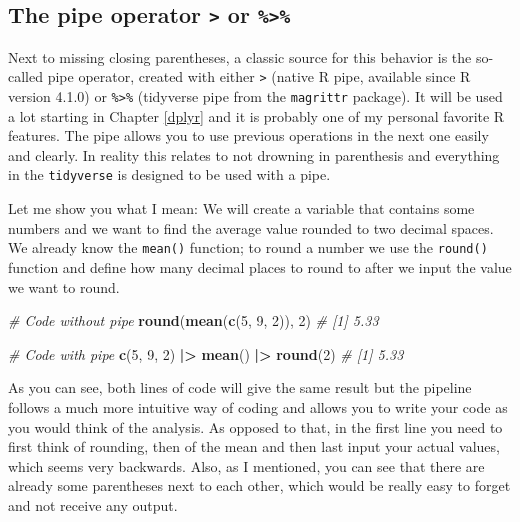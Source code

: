 \documentclass[
]{book}
\newenvironment{Shaded}{\begin{snugshade}}{\end{snugshade}}
\newcommand{\CommentTok}[1]{\textcolor[rgb]{0.56,0.35,0.01}{\textit{#1}}}
\newcommand{\DecValTok}[1]{\textcolor[rgb]{0.00,0.00,0.81}{#1}}
\newcommand{\FunctionTok}[1]{\textcolor[rgb]{0.13,0.29,0.53}{\textbf{#1}}}
\newcommand{\NormalTok}[1]{#1}
\newcommand{\SpecialCharTok}[1]{\textcolor[rgb]{0.81,0.36,0.00}{\textbf{#1}}}
\begin{document}
\subsection*{\texorpdfstring{The pipe operator \texttt{\textbar{}\textgreater{}} or \texttt{\%\textgreater{}\%}}{The pipe operator \textbar\textgreater{} or \%\textgreater\%}}\label{pipe}

Next to missing closing parentheses, a classic source for this behavior is the so-called pipe operator, created with either \texttt{\textbar{}\textgreater{}} (native R pipe, available since R version 4.1.0) or \texttt{\%\textgreater{}\%} (tidyverse pipe from the \texttt{magrittr} package).
It will be used a lot starting in Chapter \ref{dplyr} and it is probably one of my personal favorite R features.
The pipe allows you to use previous operations in the next one easily and clearly.
In reality this relates to not drowning in parenthesis and everything in the \texttt{tidyverse} is designed to be used with a pipe.

Let me show you what I mean: We will create a variable that contains some numbers and we want to find the average value rounded to two decimal spaces.
We already know the \texttt{mean()} function; to round a number we use the \texttt{round()} function and define how many decimal places to round to after we input the value we want to round.

\begin{Shaded}
\begin{Highlighting}[]
\CommentTok{\# Code without pipe}
\FunctionTok{round}\NormalTok{(}\FunctionTok{mean}\NormalTok{(}\FunctionTok{c}\NormalTok{(}\DecValTok{5}\NormalTok{, }\DecValTok{9}\NormalTok{, }\DecValTok{2}\NormalTok{)), }\DecValTok{2}\NormalTok{)}
\CommentTok{\# [1] 5.33}

\CommentTok{\# Code with pipe}
\FunctionTok{c}\NormalTok{(}\DecValTok{5}\NormalTok{, }\DecValTok{9}\NormalTok{, }\DecValTok{2}\NormalTok{) }\SpecialCharTok{|\textgreater{}} \FunctionTok{mean}\NormalTok{() }\SpecialCharTok{|\textgreater{}} \FunctionTok{round}\NormalTok{(}\DecValTok{2}\NormalTok{)}
\CommentTok{\# [1] 5.33}
\end{Highlighting}
\end{Shaded}

As you can see, both lines of code will give the same result but the pipeline follows a much more intuitive way of coding and allows you to write your code as you would think of the analysis.
As opposed to that, in the first line you need to first think of rounding, then of the mean and then last input your actual values, which seems very backwards.
Also, as I mentioned, you can see that there are already some parentheses next to each other, which would be really easy to forget and not receive any output.
\end{document}
